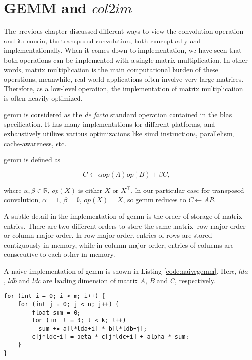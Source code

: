 
\chapter{GEMM and $col2im$}

The previous chapter discussed different ways to view the convolution operation and its cousin,
the transposed convolution, both conceptually and implementationally. When it comes down to implementation,
we have seen that both operations can be implemented with a single matrix multiplication. In other words,
matrix multiplication is the main computational burden of these operations, meanwhile, real world applications
often involve very large matrices. Therefore, as a low-level operation, the implementation of matrix
multiplication is often heavily optimized.

\gls{gemm} is considered as the \textit{de facto} standard operation
contained in the \gls{blas} specification. It has many implementations for
different platforms, and exhaustively utilizes various optimizations like \gls{simd} instructions,
parallelism, cache-awareness, etc.

\gls{gemm} is defined as

$$C \leftarrow \alpha op(A) op(B) + \beta C,$$

where $\alpha, \beta \in \mathbb{R}$, $op(X)$ is either $X$ or $X^\intercal$. In our particular case for
transposed convolution, $\alpha = 1$, $\beta = 0$, $op(X) = X$, so \gls{gemm} reduces to $C \leftarrow A B$.

A subtle detail in the implementation of \gls{gemm} is the order of storage of matrix entries. There are two
different orders to store the same matrix: row-major order or column-major order. In row-major order,
entries of rows are stored contiguously in memory, while in column-major order, entries of columns are
consecutive to each other in memory.

A naïve implementation of \gls{gemm} is shown in Listing \ref{code:naivegemm}. Here, $lda$, $ldb$ and $ldc$ are
leading dimension of matrix $A$, $B$ and $C$, respectively.

\begin{code}
\begin{verbatim}
for (int i = 0; i < m; i++) {
    for (int j = 0; j < n; j++) {
        float sum = 0;
        for (int l = 0; l < k; l++)
          sum += a[l*lda+i] * b[l*ldb+j];
        c[j*ldc+i] = beta * c[j*ldc+i] + alpha * sum;
    }
}
\end{verbatim}
\label{code:naivegemm}
\end{code}

